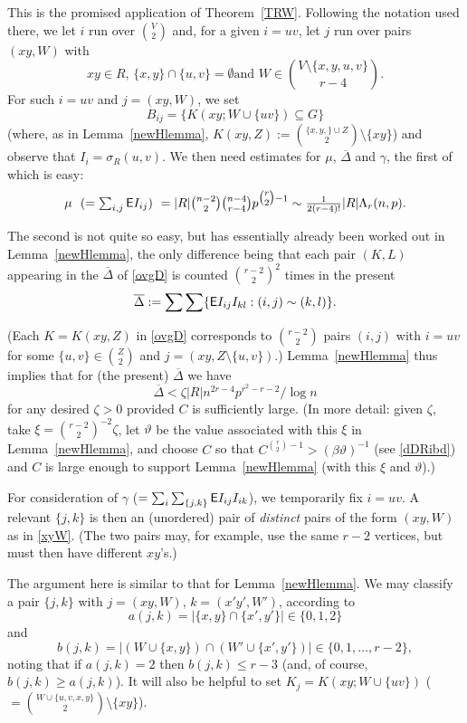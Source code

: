 \documentclass[letterpaper,11pt]{article}
\newcommand{\beq}[1]{\begin{equation}\label{#1}}
\newcommand{\enq}[0]{\end{equation}}
\newcommand{\mn}[0]{\medskip\noindent}
\newcommand{\sub}[0]{\subseteq}
\newcommand{\sm}[0]{\setminus}
\renewcommand{\dots}[0]{,\ldots,}
\newcommand{\ov}[0]{\overline}
\newcommand{\0}[0]{\emptyset}
\newcommand{\C}[2]{{{#1}\choose{{#2}}}}
\newcommand{\Cc}[0]{\tbinom}
\newcommand{\gb}[0]{\beta }
\newcommand{\gc}[0]{\gamma }
\newcommand{\gD}[0]{\Delta }
\newcommand{\gL}[0]{\Lambda}
\newcommand{\gs}[0]{\sigma}
\newcommand{\gz}[0]{\zeta}
\newcommand{\vt}[0]{\vartheta}
\begin{document}
This is the promised
application of Theorem~\ref{TRW}.
Following the notation used there,
we let $i$ run over $\C{V}{2}$ and,
for a given $i=uv$, let $j$ run over pairs $(xy,W)$
with
\beq{xyW}
\mbox{$xy\in R$, $\{x,y\}\cap \{u,v\}=\0$
and $W\in \C{V\sm \{x,y,u,v\}}{r-4}$.}
\enq
For such
$i=uv$ and $j= (xy,W)$, we set
\[
B_{ij}=
\{K(xy;W\cup \{uv\})\sub G\}
\]
(where, as in Lemma~\ref{newHlemma},
$K(xy,Z) := \C{\{x,y,\}\cup Z}{2}\sm \{xy\}$)
%
and observe that $I_i=\gs_R(u,v)$.
We then need estimates for $\mu$, $\ov{\gD}$ and $\gc$,
the first of which is easy:
\[\mbox{$\mu
 ~~(=\sum_{i,j}\E I_{ij}) ~
= |R|\Cc{n-2}{2}\Cc{n-4}{r-4}p^{\Cc{r}{2}-1}
\sim \tfrac{1}{2(r-4)!} |R|
\gL_r(n,p)$.}\]


The second is not quite so easy, but has essentially
already been worked out in Lemma~\ref{newHlemma},
the only difference being that
each pair $(K,L)$ appearing in
the $\ov{\gD}$ of
\eqref{ovgD} is counted $\C{r-2}{2}^2$ times in the present
\[
\ov{\gD} := \sum\sum\{\E I_{ij}I_{kl}:
(i,j)\sim (k,l)\}.
\]




\mn
(Each $K=K(xy,Z)$ in \eqref{ovgD}
corresponds to $\C{r-2}{2}$ pairs
$(i,j)$ with $i=uv$ for some $\{u,v\}\in \C{Z}{2}$
and $j= (xy,Z\sm \{u,v\})$.)
%
Lemma~\ref{newHlemma} thus implies that for (the present) $\ov{\gD}$
we have
\beq{gDbd}
\ov{\gD} < \gz |R|n^{2r-4}p^{r^2-r-2}/\log n
\enq
for any desired $\gz>0$ provided $C$ is sufficiently large.
(In more detail: given $\gz$, take
$\xi = \C{r-2}{2}^{-2}\gz$, let $\vt$ be the value associated
with this $\xi$ in Lemma~\ref{newHlemma}, and choose $C$
so that
$C^{\C{r}{2}-1}> (\gb\vt)^{-1}$
(see \eqref{dDRibd})
and $C$ is large enough to support
Lemma~\ref{newHlemma} (with this $\xi$ and $\vt$).)

\medskip
For consideration of
$\gc$ ($ =\sum_i\sum_{\{j,k\}}{\sf E} I_{ij}I_{ik}$),
we temporarily fix $i=uv$.
A relevant $\{j,k\}$ is then an (unordered) pair of
{\em distinct} pairs of the form $(xy,W)$ as in \eqref{xyW}.
(The two pairs may, for example, use the same $r-2$ vertices, but
must then have different $xy$'s.)




The argument here is similar to that for Lemma~\ref{newHlemma}.
We may
classify a pair $\{j,k\}$ with
$j= (xy,W)$, $k= (x'y',W')$, according to
\[a(j,k) =|\{x,y\}\cap\{x',y'\}|\in \{0,1,2\}\]
and
\[b(j,k) =|(W\cup\{x,y\})\cap(W'\cup\{x',y'\})|
\in \{0,1\dots r-2\},\]
noting that if $a(j,k)=2$ then $b(j,k)\leq r-3$
(and, of course, $b(j,k)\geq a(j,k)$).
It will also be helpful to set
$K_j=K(xy;W\cup \{uv\})$
($=\C{W\cup \{u,v,x,y\}}{2}\sm \{xy\}$).
\end{document}
